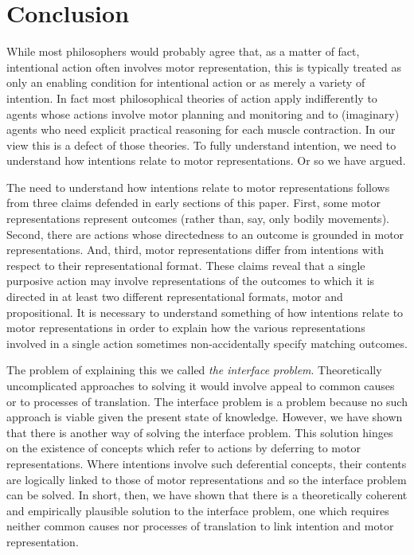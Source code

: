 \documentclass[12pt,\papersize]{extarticle}
\begin{document}
\section{Conclusion}

While most philosophers would probably agree that, as a matter of fact, intentional action often involves motor representation, this is typically treated as only an enabling condition for intentional action or as merely a variety of intention. In fact most philosophical theories of action apply indifferently to agents whose actions involve motor planning and monitoring and to (imaginary) agents who need explicit practical reasoning for each muscle contraction. In our view this is a defect of those theories. To fully understand intention, we need to understand how intentions relate to motor representations.  Or so we have argued.  

The need to understand how intentions relate to motor representations follows from three claims defended in early sections of this paper. First, some motor representations represent outcomes (rather than, say, only bodily movements). Second, there are actions whose directedness to an outcome is grounded in motor representations. And, third, motor representations differ from intentions with respect to their representational format. These claims reveal that a single purposive action may involve representations of the outcomes to which it is directed in at least two different representational formats, motor and propositional. It is necessary to understand something of how intentions relate to motor representations in order to explain how the various representations involved in a single action sometimes non-accidentally specify matching outcomes.

The problem of explaining this we called \emph{the interface problem}. Theoretically uncomplicated approaches to solving it would involve appeal to common causes or to processes of translation. The interface problem is a problem because no such approach is viable given the present state of knowledge. However, we have shown that there is another way of solving the interface problem. This solution hinges on the existence of concepts which refer to actions by deferring to motor representations. Where intentions involve such deferential concepts, their contents are logically linked to those of motor representations and so the interface problem can be solved. In short, then, we have shown that there is a theoretically coherent and empirically plausible solution to the interface problem, one which requires neither common causes nor processes of translation to link intention and motor representation.
\end{document}
